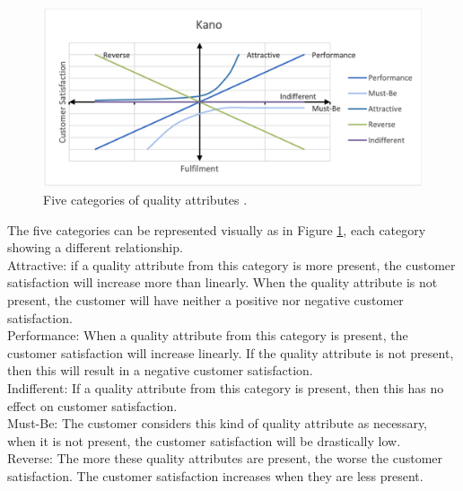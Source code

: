 \begin{figure}[ht]
	\includegraphics[scale=0.35]{../LaTeX/Figures/KANO.png}
	\caption{Five categories of quality attributes \citep{KANO1984}.}
	\label{fig:kano}
\end{figure}
\break
The five categories can be represented visually as in Figure \ref{fig:kano}, each category showing a different relationship.\\
\break
Attractive: if a quality attribute from this category is more present, the customer satisfaction will increase more than linearly. When the quality attribute is not present, the customer will have neither a positive nor negative customer satisfaction.\\
\break
Performance: When a quality attribute from this category is present, the customer satisfaction will increase linearly. If the quality attribute is not present, then this will result in a negative customer satisfaction.\\
\break
Indifferent: If a quality attribute from this category is present, then this has no effect on customer satisfaction.\\
\break
Must-Be: The customer considers this kind of quality attribute as necessary, when it is not present, the customer satisfaction will be drastically low.\\
\break
Reverse: The more these quality attributes are present, the worse the customer satisfaction. The customer satisfaction increases when they are less present.\\

